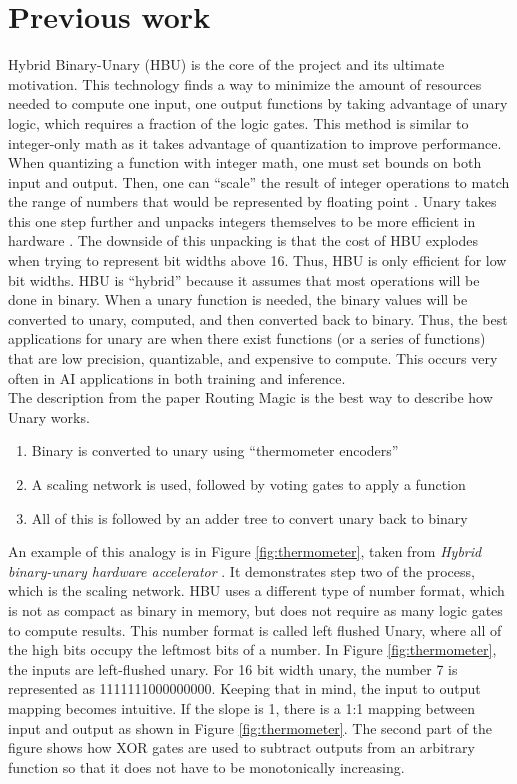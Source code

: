 \documentclass[12pt]{article}
\begin{document}
	\section{Previous work}
	Hybrid Binary-Unary (HBU) is the core of the project and its ultimate motivation. This technology finds a way to minimize the amount of resources needed to compute one input, one output functions by taking advantage of unary logic, which requires a fraction of the logic gates. This method is similar to integer-only math as it takes advantage of quantization to improve performance. When quantizing a function with integer math, one must set bounds on both input and output. Then, one can “scale” the result of integer operations to match the range of numbers that would be represented by floating point \cite{quantizing}. Unary takes this one step further and unpacks integers themselves to be more efficient in hardware \cite{unary}. The downside of this unpacking is that the cost of HBU explodes when trying to represent bit widths above 16. Thus, HBU is only efficient for low bit widths. HBU is “hybrid” because it assumes that most operations will be done in binary. When a unary function is needed, the binary values will be converted to unary, computed, and then converted back to binary. Thus, the best applications for unary are when there exist functions (or a series of functions) that are low precision, quantizable, and expensive to compute. This occurs very often in AI applications in both training and inference. 
	\\
	The description from the paper Routing Magic \cite{unary} is the best way to describe how Unary works.
	\begin{enumerate}
	\item Binary is converted to unary using “thermometer encoders”
	\item A scaling network is used, followed by voting gates to apply a function
	\item All of this is followed by an adder tree to convert unary back to binary
	\end{enumerate}
	An example of this analogy is in Figure \ref{fig:thermometer}, taken from \textit{Hybrid binary-unary hardware accelerator} \cite{hbu}. It demonstrates step two of the process, which is the scaling network. HBU uses a different type of number format, which is not as compact as binary in memory, but does not require as many logic gates to compute results. This number format is called left flushed Unary, where all of the high bits occupy the leftmost bits of a number. In Figure \ref{fig:thermometer}, the inputs are left-flushed unary. For 16 bit width unary, the number 7 is represented as 1111111000000000. Keeping that in mind, the input to output mapping becomes intuitive. If the slope is 1, there is a 1:1 mapping between input and output as shown in Figure \ref{fig:thermometer}. The second part of the figure shows how XOR gates are used to subtract outputs from an arbitrary function so that it does not have to be monotonically increasing.
	
\end{document}

